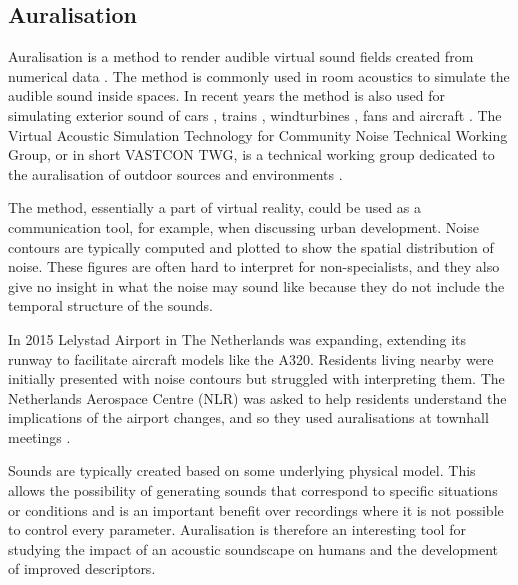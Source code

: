 

\subsection{Auralisation}\label{sec:introduction:background:auralisation}%

Auralisation is a method to render audible virtual sound fields created from numerical data \cite{Kleiner1993,Vorlander2008}.
The method is commonly used in room acoustics to simulate the audible sound inside spaces.
In recent years the method is also used for simulating exterior sound of
cars \cite{Forssen2009,Maillard2012,Pieren2015,Hoffmann2016,Hoffmann2016a},
trains \cite{Pieren2016},
windturbines \cite{Pieren2014,Heutschi2014},
fans \cite{Merino2016} and
aircraft \cite{Arntzen2014a, Rizzi2016a, Rizzi2016}.
The Virtual Acoustic Simulation Technology for Community Noise Technical Working
Group, or in short VASTCON TWG, is a technical working group dedicated to the
auralisation of outdoor sources and environments \cite{Vastcon}.

The method, essentially a part of virtual reality, could be used as a
communication tool, for example, when discussing urban development. Noise
contours are typically computed and plotted to show the spatial distribution of
noise. These figures are often hard to interpret for non-specialists, and
they also give no insight in what the noise may sound like because they do not
include the temporal structure of the sounds.

In 2015 Lelystad Airport in The Netherlands was expanding, extending its runway
to facilitate aircraft models like the A320. Residents living nearby were
initially presented with noise contours but struggled with interpreting them.
The Netherlands Aerospace Centre (NLR) was asked to help residents understand
the implications of the airport changes, and so they used auralisations at
townhall meetings \cite{Arntzen2015}.

Sounds are typically created based on some underlying physical model. This
allows the possibility of generating sounds that correspond to specific
situations or conditions and is an important benefit over recordings where it is
not possible to control every parameter. Auralisation is therefore an
interesting tool for studying the impact of an acoustic soundscape on humans and the
development of improved descriptors.

